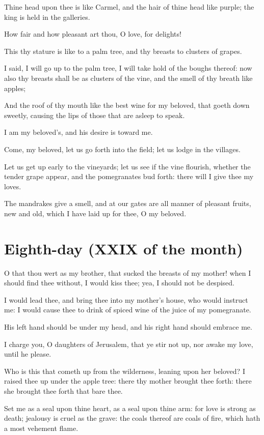 \documentclass[0main.tex]{subfiles}
\begin{document}
Thine head upon thee is like Carmel, and the hair of thine head like purple; the king is held in the galleries.

How fair and how pleasant art thou, O love, for delights!

This thy stature is like to a palm tree, and thy breasts to clusters of grapes.

I said, I will go up to the palm tree, I will take hold of the boughs thereof: now also thy breasts shall be as clusters of the vine, and the smell of thy breath like apples;

And the roof of thy mouth like the best wine for my beloved, that goeth down sweetly, causing the lips of those that are asleep to speak.

I am my beloved's, and his desire is toward me.

Come, my beloved, let us go forth into the field; let us lodge in the villages.

Let us get up early to the vineyards; let us see if the vine flourish, whether the tender grape appear, and the pomegranates bud forth: there will I give thee my loves.

The mandrakes give a smell, and at our gates are all manner of pleasant fruits, new and old, which I have laid up for thee, O my beloved.

\section*{Eighth-day (XXIX of the month)}

O that thou wert as my brother, that sucked the breasts of my mother! when I should find thee without, I would kiss thee; yea, I should not be despised.

I would lead thee, and bring thee into my mother's house, who would instruct me: I would cause thee to drink of spiced wine of the juice of my pomegranate.

His left hand should be under my head, and his right hand should embrace me.

I charge you, O daughters of Jerusalem, that ye stir not up, nor awake my love, until he please.

Who is this that cometh up from the wilderness, leaning upon her beloved? I raised thee up under the apple tree: there thy mother brought thee forth: there she brought thee forth that bare thee.

Set me as a seal upon thine heart, as a seal upon thine arm: for love is strong as death; jealousy is cruel as the grave: the coals thereof are coals of fire, which hath a most vehement flame.
\end{document}
